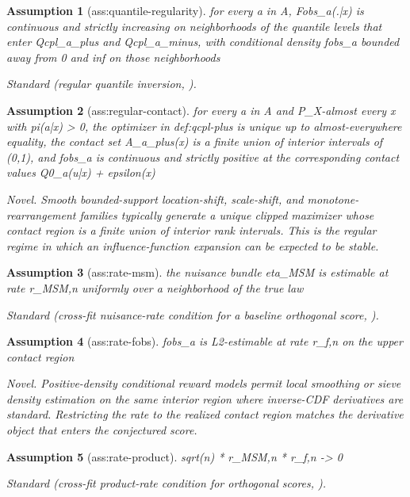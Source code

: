 \documentclass{article}
\newtheorem{assumption}{Assumption}
\begin{document}
\begin{assumption}[ass:quantile-regularity]\label{ass:quantile-regularity}
for every a in A, Fobs_a(.|x) is continuous and strictly increasing on neighborhoods of the quantile levels that enter Qcpl_a_plus and Qcpl_a_minus, with conditional density fobs_a bounded away from 0 and inf on those neighborhoods
\par\smallskip\noindent\emph{Standard} (regular quantile inversion, \cite{Firpo2007}).
\end{assumption}

\begin{assumption}[ass:regular-contact]\label{ass:regular-contact}
for every a in A and P_X-almost every x with pi(a|x) > 0, the optimizer in def:qcpl-plus is unique up to almost-everywhere equality, the contact set A_a_plus(x) is a finite union of interior intervals of (0,1), and fobs_a is continuous and strictly positive at the corresponding contact values Q0_a(u|x) + epsilon(x)
\par\smallskip\noindent\emph{Novel.} Smooth bounded-support location-shift, scale-shift, and monotone-rearrangement families typically generate a unique clipped maximizer whose contact region is a finite union of interior rank intervals. This is the regular regime in which an influence-function expansion can be expected to be stable.
\end{assumption}

\begin{assumption}[ass:rate-msm]\label{ass:rate-msm}
the nuisance bundle eta_MSM is estimable at rate r_MSM,n uniformly over a neighborhood of the true law
\par\smallskip\noindent\emph{Standard} (cross-fit nuisance-rate condition for a baseline orthogonal score, \cite{ChernozhukovEtAl2018}).
\end{assumption}

\begin{assumption}[ass:rate-fobs]\label{ass:rate-fobs}
fobs_a is L2-estimable at rate r_f,n on the upper contact region
\par\smallskip\noindent\emph{Novel.} Positive-density conditional reward models permit local smoothing or sieve density estimation on the same interior region where inverse-CDF derivatives are standard. Restricting the rate to the realized contact region matches the derivative object that enters the conjectured score.
\end{assumption}

\begin{assumption}[ass:rate-product]\label{ass:rate-product}
sqrt(n) * r_MSM,n * r_f,n -> 0
\par\smallskip\noindent\emph{Standard} (cross-fit product-rate condition for orthogonal scores, \cite{ChernozhukovEtAl2018}).
\end{assumption}
\end{document}
